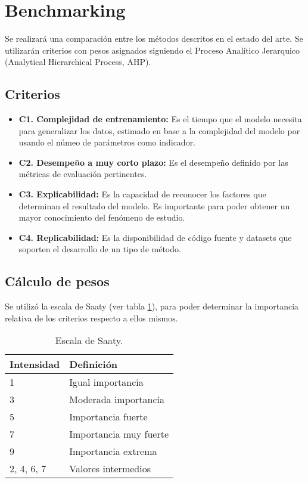 \section{Benchmarking}

Se realizará una comparación entre los métodos descritos en el estado del arte. 
Se utilizarán criterios con pesos asignados siguiendo el Proceso Analítico 
Jerarquico (Analytical Hierarchical Process, AHP).
		
\subsection{Criterios}

\begin{itemize}
  \item \textbf{C1. Complejidad de entrenamiento:} Es el tiempo que 
  el modelo necesita para generalizar los datos, estimado en base a la 
  complejidad del modelo por usando el númeo de parámetros como indicador.
  \item \textbf{C2. Desempeño a muy corto plazo:} Es el desempeño definido por 
  las métricas de evaluación pertinentes.
  \item \textbf{C3. Explicabilidad:} Es la capacidad de reconocer los factores 
  que determinan el resultado del modelo. Es importante para poder obtener un 
  mayor conocimiento del fenómeno de estudio.
  \item \textbf{C4. Replicabilidad:} Es la disponibilidad de código fuente 
  y datasets que soporten el desarrollo de un tipo de método.
\end{itemize}

\subsection{Cálculo de pesos}
Se utilizó la escala de Saaty (ver tabla \ref{tab:escala_saaty}), para poder 
determinar la importancia relativa de los criterios respecto a ellos mismos.

\begin{table}[H]
  \centering
  \caption[Escala de Saaty]{Escala de Saaty.}
  \begin{tabular}{l|l}
  \textbf{Intensidad} & \textbf{Definición}    \\ \hline
  1                   & Igual importancia      \\
  3                   & Moderada importancia   \\
  5                   & Importancia fuerte     \\
  7                   & Importancia muy fuerte \\
  9                   & Importancia extrema    \\
  2, 4, 6, 7          & Valores intermedios   
  \end{tabular}
  \label{tab:escala_saaty}
\end{table}


